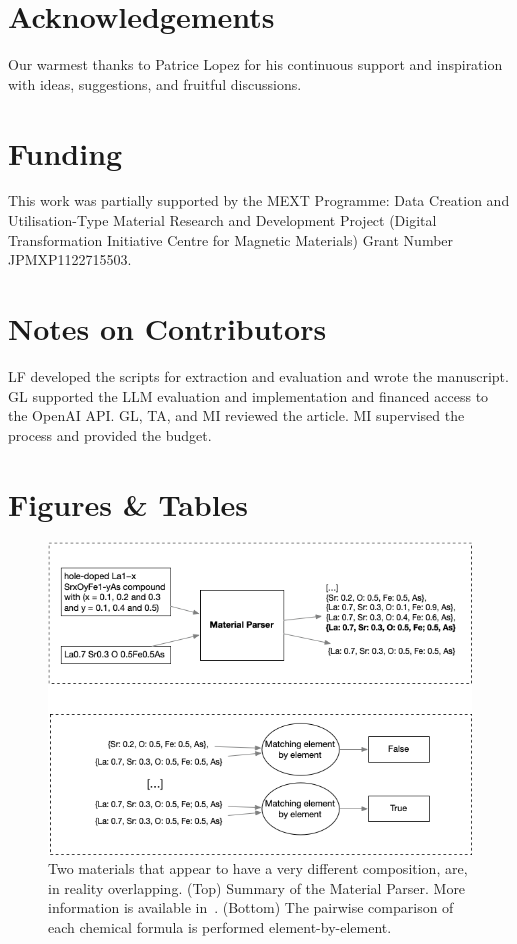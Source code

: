 \section*{Acknowledgements}
Our warmest thanks to Patrice Lopez for his continuous support and inspiration with ideas, suggestions, and fruitful discussions.


\section*{Funding}
This work was partially supported by the MEXT Programme: Data Creation and Utilisation-Type Material Research and Development Project (Digital Transformation Initiative Centre for Magnetic Materials) Grant Number JPMXP1122715503.


\section*{Notes on Contributors}
LF developed the scripts for extraction and evaluation and wrote the manuscript.
GL supported the LLM evaluation and implementation and financed access to the OpenAI API. 
GL, TA, and MI reviewed the article.
MI supervised the process and provided the budget. 






\section*{Figures \& Tables}

\begin{figure}[ht]
  \centering
  \includegraphics[width=1\textwidth]{figures/formula-matching-schema.png} 
  \caption{Two materials that appear to have a very different composition, are, in reality overlapping. (Top) Summary of the Material Parser. More information is available in~\cite{lfoppiano2023automatic}. (Bottom) The pairwise comparison of each chemical formula is performed element-by-element.  }
  \label{fig:formula-matching-schema}
\end{figure}

